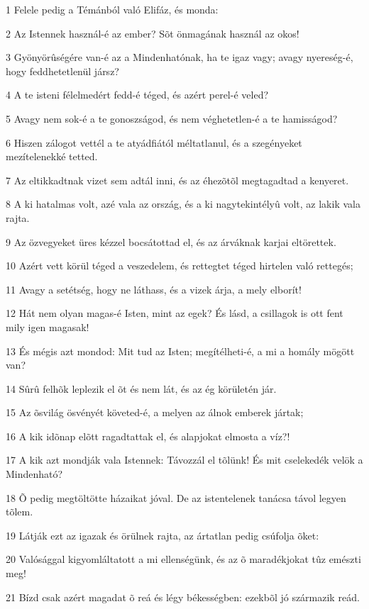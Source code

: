 \par 1 Felele pedig a Témánból való Elifáz, és monda:
\par 2 Az Istennek használ-é az ember? Sõt önmagának használ az okos!
\par 3 Gyönyörûségére van-é az a Mindenhatónak, ha te igaz vagy; avagy nyereség-é, hogy feddhetetlenül jársz?
\par 4 A te isteni félelmedért fedd-é téged, és azért perel-é veled?
\par 5 Avagy nem sok-é a te gonoszságod, és nem véghetetlen-é a te hamisságod?
\par 6 Hiszen zálogot vettél a te atyádfiától méltatlanul, és a szegényeket mezítelenekké tetted.
\par 7 Az eltikkadtnak vizet sem adtál inni, és az éhezõtõl megtagadtad a kenyeret.
\par 8 A ki hatalmas volt, azé vala az ország, és a ki nagytekintélyû volt, az lakik vala rajta.
\par 9 Az özvegyeket üres kézzel bocsátottad el, és az árváknak karjai  eltörettek.
\par 10 Azért vett körül téged a veszedelem, és rettegtet téged hirtelen való rettegés;
\par 11 Avagy a setétség, hogy ne láthass, és a vizek árja, a mely elborít!
\par 12 Hát nem olyan magas-é Isten, mint az egek? És lásd, a csillagok is ott fent mily igen magasak!
\par 13 És mégis azt mondod: Mit tud az Isten; megítélheti-é, a mi a homály mögött van?
\par 14 Sûrû felhõk leplezik el õt és nem lát, és az ég körületén jár.
\par 15 Az õsvilág ösvényét követed-é, a melyen az álnok emberek jártak;
\par 16 A kik idõnap elõtt ragadtattak el, és alapjokat elmosta a víz?!
\par 17 A kik azt mondják vala Istennek: Távozzál el tõlünk! És mit cselekedék velök a Mindenható?
\par 18 Õ pedig megtöltötte házaikat jóval. De az istentelenek tanácsa távol legyen tõlem.
\par 19 Látják ezt az igazak és örülnek rajta, az ártatlan pedig csúfolja õket:
\par 20 Valósággal kigyomláltatott a mi ellenségünk, és az õ maradékjokat tûz emészti meg!
\par 21 Bízd csak azért magadat õ reá és légy békességben: ezekbõl jó származik reád.
